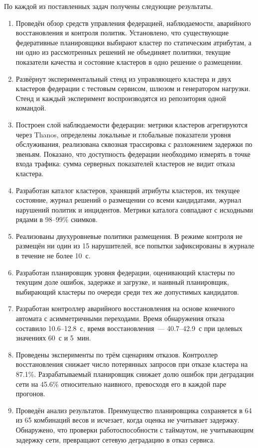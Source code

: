 
По каждой из поставленных задач получены следующие результаты.

\begin{enumerate}
  \item Проведён обзор средств управления федерацией, наблюдаемости,
        аварийного восстановления и контроля политик. Установлено, что
        существующие федеративные планировщики выбирают кластер по
        статическим атрибутам, а ни одно из рассмотренных решений не
        объединяет политики, текущие показатели качества и состояние
        кластеров в одно решение о размещении.
  \item Развёрнут экспериментальный стенд из управляющего кластера и двух
        кластеров федерации с тестовым сервисом, шлюзом и генератором
        нагрузки. Стенд и каждый эксперимент воспроизводятся из
        репозитория одной командой.
  \item Построен слой наблюдаемости федерации: метрики кластеров
        агрегируются через Thanos, определены локальные и глобальные
        показатели уровня обслуживания, реализована сквозная трассировка с
        разложением задержки по звеньям. Показано, что доступность
        федерации необходимо измерять в точке входа трафика: сумма
        серверных показателей кластеров не видит отказа кластера.
  \item Разработан каталог кластеров, хранящий атрибуты кластеров, их
        текущее состояние, журнал решений о размещении со всеми
        кандидатами, журнал нарушений политик и инцидентов. Метрики
        каталога совпадают с исходными рядами в 98--99\% снимков.
  \item Реализованы двухуровневые политики размещения. В режиме контроля
        не размещён ни один из 15 нарушителей, все попытки зафиксированы в
        журнале в течение не более 10~с.
  \item Разработан планировщик уровня федерации, оценивающий кластеры по
        текущим доле ошибок, задержке и загрузке, и наивный планировщик,
        выбирающий кластеры по очереди среди тех же допустимых кандидатов.
  \item Разработан контроллер аварийного восстановления на основе конечного
        автомата с асимметричными переходами. Время обнаружения отказа
        составило 10.6--12.8~с, время восстановления~--- 40.7--42.9~с при
        целевых значениях 60~с и 5~мин.
  \item Проведены эксперименты по трём сценариям отказов. Контроллер
        восстановления снижает число потерянных запросов при отказе
        кластера на 87.1\%. Разрабатываемый планировщик снижает долю ошибок
        при деградации сети на 45.6\% относительно наивного, превосходя его
        в каждой паре прогонов.
  \item Проведён анализ результатов. Преимущество планировщика сохраняется
        в 64 из 65 комбинаций весов и исчезает, когда оценка не учитывает
        задержку. Обнаружено, что проверки работоспособности с таймаутом,
        не учитывающим задержку сети, превращают сетевую деградацию в отказ
        сервиса.
\end{enumerate}
